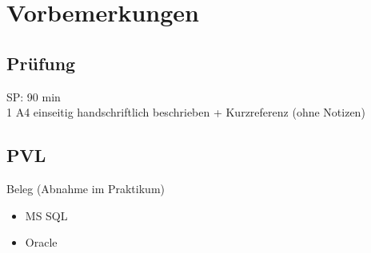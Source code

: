 \newcommand{\customDir}{../}








%



\maketitle
\newpage
\tableofcontents
\newpage
\chapter*{Vorbemerkungen}
\section*{Prüfung}
SP: 90 min\\
1 A4 einseitig handschriftlich beschrieben + Kurzreferenz (ohne Notizen)

\section*{PVL}
Beleg (Abnahme im Praktikum)
\begin{itemize}
\item MS SQL
\item Oracle
\end{itemize}

